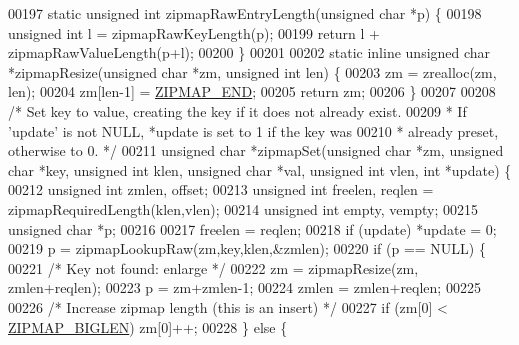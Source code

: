 \begin{DoxyCode}
00197 \textcolor{keyword}{static} \textcolor{keywordtype}{unsigned} \textcolor{keywordtype}{int} zipmapRawEntryLength(\textcolor{keywordtype}{unsigned} \textcolor{keywordtype}{char} *p) \{
00198     \textcolor{keywordtype}{unsigned} \textcolor{keywordtype}{int} l = zipmapRawKeyLength(p);
00199     \textcolor{keywordflow}{return} l + zipmapRawValueLength(p+l);
00200 \}
00201 
00202 \textcolor{keyword}{static} \textcolor{keyword}{inline} \textcolor{keywordtype}{unsigned} \textcolor{keywordtype}{char} *zipmapResize(\textcolor{keywordtype}{unsigned} \textcolor{keywordtype}{char} *zm, \textcolor{keywordtype}{unsigned} \textcolor{keywordtype}{int} len) \{
00203     zm = zrealloc(zm, len);
00204     zm[len-1] = \hyperlink{zipmap_8c_a7074100d2ecc0c8971936a4edc208782}{ZIPMAP\_END};
00205     \textcolor{keywordflow}{return} zm;
00206 \}
00207 
00208 \textcolor{comment}{/* Set key to value, creating the key if it does not already exist.}
00209 \textcolor{comment}{ * If 'update' is not NULL, *update is set to 1 if the key was}
00210 \textcolor{comment}{ * already preset, otherwise to 0. */}
00211 \textcolor{keywordtype}{unsigned} \textcolor{keywordtype}{char} *zipmapSet(\textcolor{keywordtype}{unsigned} \textcolor{keywordtype}{char} *zm, \textcolor{keywordtype}{unsigned} \textcolor{keywordtype}{char} *key, \textcolor{keywordtype}{unsigned} \textcolor{keywordtype}{int} klen, \textcolor{keywordtype}{unsigned} \textcolor{keywordtype}{char} *val,
       \textcolor{keywordtype}{unsigned} \textcolor{keywordtype}{int} vlen, \textcolor{keywordtype}{int} *update) \{
00212     \textcolor{keywordtype}{unsigned} \textcolor{keywordtype}{int} zmlen, offset;
00213     \textcolor{keywordtype}{unsigned} \textcolor{keywordtype}{int} freelen, reqlen = zipmapRequiredLength(klen,vlen);
00214     \textcolor{keywordtype}{unsigned} \textcolor{keywordtype}{int} empty, vempty;
00215     \textcolor{keywordtype}{unsigned} \textcolor{keywordtype}{char} *p;
00216 
00217     freelen = reqlen;
00218     \textcolor{keywordflow}{if} (update) *update = 0;
00219     p = zipmapLookupRaw(zm,key,klen,&zmlen);
00220     \textcolor{keywordflow}{if} (p == NULL) \{
00221         \textcolor{comment}{/* Key not found: enlarge */}
00222         zm = zipmapResize(zm, zmlen+reqlen);
00223         p = zm+zmlen-1;
00224         zmlen = zmlen+reqlen;
00225 
00226         \textcolor{comment}{/* Increase zipmap length (this is an insert) */}
00227         \textcolor{keywordflow}{if} (zm[0] < \hyperlink{zipmap_8c_a1173592dbfaa84c6b2419d0a699c97f5}{ZIPMAP\_BIGLEN}) zm[0]++;
00228     \} \textcolor{keywordflow}{else} \{

\end{DoxyCode}
